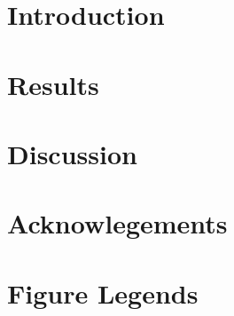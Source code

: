 \begin{bibunit}[naturemag]
\maketitle

\tableofcontents



\section{Introduction}




\section{Results}


\section{Discussion}


\section{Acknowlegements}

{\footnotesize
% 
% 
}


\pagebreak
\FloatBarrier
\section{Figure Legends}

\end{bibunit}

\pagebreak
\FloatBarrier

